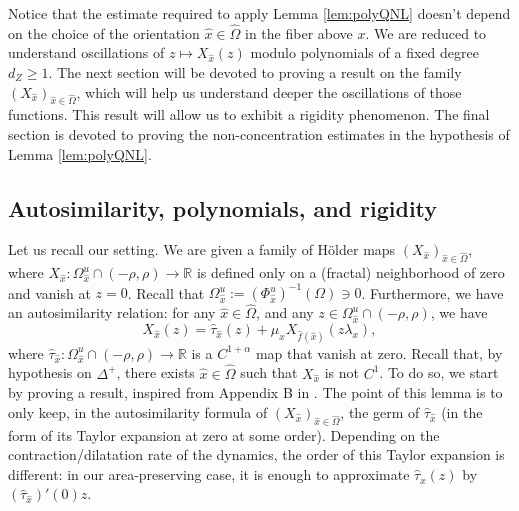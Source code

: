 \documentclass[a4paper]{article}
\theoremstyle{definition}
\begin{document}
Notice that the estimate required to apply Lemma \ref{lem:polyQNL} doesn't depend on the choice of the orientation $\widehat{x} \in \widehat{\Omega}$ in the fiber above $x$. We are reduced to understand oscillations of $ z \mapsto X_{\widehat{x}}(z)$ modulo polynomials of a fixed degree $d_{Z} \geq 1$. The next section will be devoted to proving a  result on the family $(X_{\widehat{x}})_{{\widehat{x}} \in \widehat{\Omega}}$, which will help us understand deeper the oscillations of those functions. This  result will allow us to exhibit a rigidity phenomenon. The final section is devoted to proving the non-concentration estimates in the hypothesis of Lemma \ref{lem:polyQNL}.

\subsection{Autosimilarity, polynomials, and rigidity}
Let us recall our setting. We are given a family of Hölder maps $(X_{\widehat{x}})_{{\widehat{x}} \in \widehat{\Omega}}$, where $X_{\widehat{x}} : \Omega_{\widehat{x}}^u \cap (-\rho,\rho) \longrightarrow \mathbb{R}$ is defined only on a (fractal) neighborhood of zero and vanish at $z=0$. Recall that $\Omega_{\widehat{x}}^u := (\Phi_{\widehat{x}}^u)^{-1}(\Omega) \ni 0$. Furthermore, we have an autosimilarity relation: for any ${\widehat{x}} \in \widehat{\Omega}$, and any $z \in \Omega_{\widehat{x}}^u \cap (-\rho,\rho)$, we have
$$ X_{\widehat{x}}(z) = \widehat{\tau}_{\widehat{x}}(z) + \mu_x X_{\widehat{f}({\widehat{x}})}(z \lambda_x) ,$$
where $\widehat{\tau}_{\widehat{x}} :  \Omega_{\widehat{x}}^u \cap (-\rho,\rho) \rightarrow \mathbb{R}$ is a $C^{1+\alpha}$ map that vanish at zero. Recall that, by hypothesis on $\Delta^+$, there exists $\widehat{x} \in \widehat{\Omega}$ such that $X_{\widehat{x}}$ is not $C^1$. To do so, we start by proving a  result, inspired from Appendix B in  \cite{TZ20}. The point of this lemma is to only keep, in the autosimilarity formula of $(X_{\widehat{x}})_{{\widehat{x}} \in \widehat{\Omega}}$, the germ of $\widehat{\tau}_{\widehat{x}}$ (in the form of its Taylor expansion at zero at some order). Depending on the contraction/dilatation rate of the dynamics, the order of this Taylor expansion is different: in our area-preserving case, it is enough to approximate $\widehat{\tau}_{\widehat{x}}(z)$ by $(\widehat{\tau}_{\widehat{x}})'(0)z$.
\end{document}
